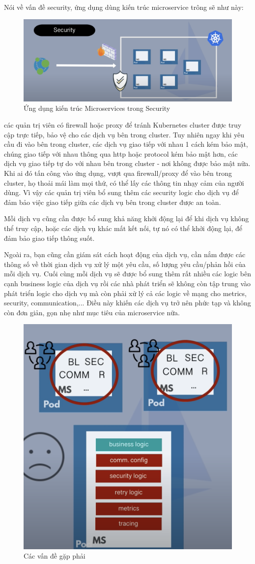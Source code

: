 \documentclass[14pt,a4paper]{book}
\begin{document}
		\newpage Nói về vấn đề security, ứng dụng dùng kiến trúc microservice trông sẽ như này:
		\begin{figure}[h]
			\centering
			\includegraphics[width=0.7\linewidth]{Pics/2.1.1-p1}
			\caption{Ứng dụng kiến trúc Microservices trong Security}
			\label{fig:2.1.1-1}
		\end{figure}
		
		các quản trị viên có firewall hoặc proxy để tránh Kubernetes cluster được truy cập trực tiếp, bảo vệ cho các dịch vụ bên trong cluster. Tuy nhiên ngay khi yêu cầu đi vào bên trong cluster, các dịch vụ giao tiếp với nhau 1 cách kém bảo mật, chúng giao tiếp với nhau thông qua http hoặc protocol kém bảo mật hơn, các dịch vụ giao tiếp tự do với nhau bên trong cluster - nơi không được bảo mật nữa. Khi ai đó tấn công vào ứng dụng, vượt qua firewall/proxy để vào bên trong cluster, họ thoải mái làm mọi thứ, có thể lấy các thông tin nhạy cảm của người dùng. Vì vậy các quản trị viên bổ sung thêm các security logic cho dịch vụ để đảm bảo việc giao tiếp giữa các dịch vụ bên trong cluster được an toàn.
		
		Mỗi dịch vụ cũng cần được bổ sung khả năng khởi động lại để khi dịch vụ không thể truy cập, hoặc các dịch vụ khác mất kết nối, tự nó có thể khởi động lại, để đảm bảo giao tiếp thông suốt.
		
		Ngoài ra, bạn cũng cần giám sát cách hoạt động của dịch vụ, cần nắm được các thông số về thời gian dịch vụ xử lý một yêu cầu, số lượng yêu cầu/phản hồi của mỗi dịch vụ. Cuối cùng mỗi dịch vụ sẽ được bổ sung thêm rất nhiều các logic bên cạnh business logic của dịch vụ rồi các nhà phát triển sẽ không còn tập trung vào phát triển logic cho dịch vụ mà còn phải xử lý cả các logic về mạng cho metrics, security, communication,... Điều này khiến các dịch vụ trở nên phức tạp và không còn đơn giản, gọn nhẹ như mục tiêu của microservice nữa.
		\begin{figure}[h]
			\centering
			\includegraphics[width=0.48\linewidth]{Pics/2.1.1-p2}
			\caption{Các vấn đề gặp phải}
			\label{fig:2.1.1-2}
		\end{figure}
		
\end{document}
